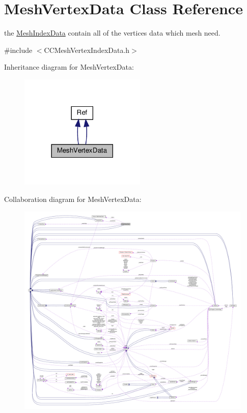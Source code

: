 \hypertarget{classMeshVertexData}{}\section{Mesh\+Vertex\+Data Class Reference}
\label{classMeshVertexData}


the \hyperlink{classMeshIndexData}{Mesh\+Index\+Data} contain all of the vertices data which mesh need.  




{\ttfamily \#include $<$C\+C\+Mesh\+Vertex\+Index\+Data.\+h$>$}



Inheritance diagram for Mesh\+Vertex\+Data\+:
\nopagebreak
\begin{figure}[H]
\begin{center}
\leavevmode
\includegraphics[width=170pt]{classMeshVertexData__inherit__graph}
\end{center}
\end{figure}


Collaboration diagram for Mesh\+Vertex\+Data\+:
\nopagebreak
\begin{figure}[H]
\begin{center}
\leavevmode
\includegraphics[width=350pt]{classMeshVertexData__coll__graph}
\end{center}
\end{figure}
